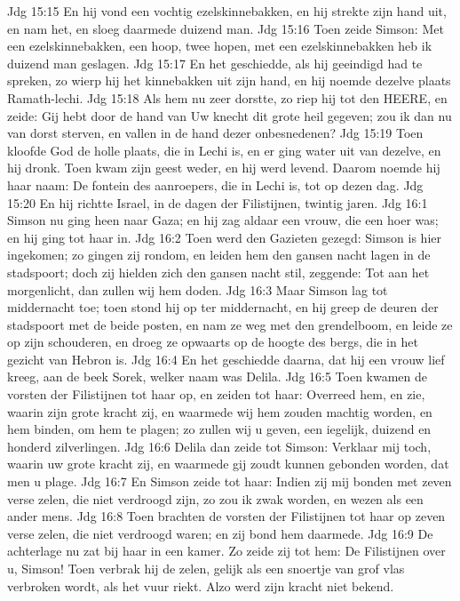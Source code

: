 Jdg 15:15  En hij vond een vochtig ezelskinnebakken, en hij strekte zijn hand uit, en nam het, en sloeg daarmede duizend man.
Jdg 15:16  Toen zeide Simson: Met een ezelskinnebakken, een hoop, twee hopen, met een ezelskinnebakken heb ik duizend man geslagen.
Jdg 15:17  En het geschiedde, als hij geeindigd had te spreken, zo wierp hij het kinnebakken uit zijn hand, en hij noemde dezelve plaats Ramath-lechi.
Jdg 15:18  Als hem nu zeer dorstte, zo riep hij tot den HEERE, en zeide: Gij hebt door de hand van Uw knecht dit grote heil gegeven; zou ik dan nu van dorst sterven, en vallen in de hand dezer onbesnedenen?
Jdg 15:19  Toen kloofde God de holle plaats, die in Lechi is, en er ging water uit van dezelve, en hij dronk. Toen kwam zijn geest weder, en hij werd levend. Daarom noemde hij haar naam: De fontein des aanroepers, die in Lechi is, tot op dezen dag.
Jdg 15:20  En hij richtte Israel, in de dagen der Filistijnen, twintig jaren.
Jdg 16:1  Simson nu ging heen naar Gaza; en hij zag aldaar een vrouw, die een hoer was; en hij ging tot haar in.
Jdg 16:2  Toen werd den Gazieten gezegd: Simson is hier ingekomen; zo gingen zij rondom, en leiden hem den gansen nacht lagen in de stadspoort; doch zij hielden zich den gansen nacht stil, zeggende: Tot aan het morgenlicht, dan zullen wij hem doden.
Jdg 16:3  Maar Simson lag tot middernacht toe; toen stond hij op ter middernacht, en hij greep de deuren der stadspoort met de beide posten, en nam ze weg met den grendelboom, en leide ze op zijn schouderen, en droeg ze opwaarts op de hoogte des bergs, die in het gezicht van Hebron is.
Jdg 16:4  En het geschiedde daarna, dat hij een vrouw lief kreeg, aan de beek Sorek, welker naam was Delila.
Jdg 16:5  Toen kwamen de vorsten der Filistijnen tot haar op, en zeiden tot haar: Overreed hem, en zie, waarin zijn grote kracht zij, en waarmede wij hem zouden machtig worden, en hem binden, om hem te plagen; zo zullen wij u geven, een iegelijk, duizend en honderd zilverlingen.
Jdg 16:6  Delila dan zeide tot Simson: Verklaar mij toch, waarin uw grote kracht zij, en waarmede gij zoudt kunnen gebonden worden, dat men u plage.
Jdg 16:7  En Simson zeide tot haar: Indien zij mij bonden met zeven verse zelen, die niet verdroogd zijn, zo zou ik zwak worden, en wezen als een ander mens.
Jdg 16:8  Toen brachten de vorsten der Filistijnen tot haar op zeven verse zelen, die niet verdroogd waren; en zij bond hem daarmede.
Jdg 16:9  De achterlage nu zat bij haar in een kamer. Zo zeide zij tot hem: De Filistijnen over u, Simson! Toen verbrak hij de zelen, gelijk als een snoertje van grof vlas verbroken wordt, als het vuur riekt. Alzo werd zijn kracht niet bekend.
